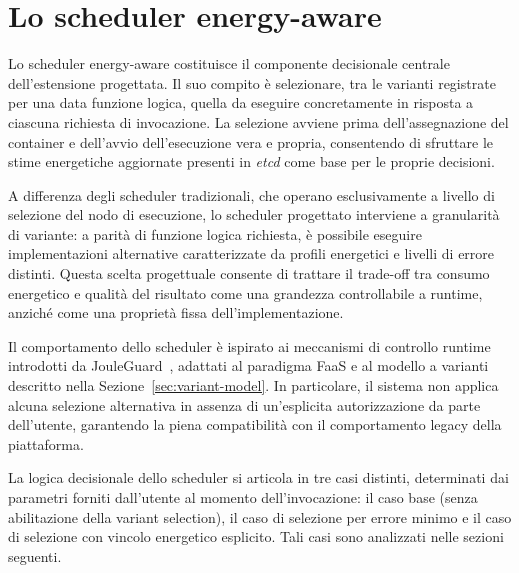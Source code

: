 
\section{Lo scheduler energy-aware}
\label{sec:scheduler}

Lo scheduler energy-aware costituisce il componente decisionale centrale
dell'estensione progettata. Il suo compito è selezionare, tra le varianti
registrate per una data funzione logica, quella da eseguire concretamente
in risposta a ciascuna richiesta di invocazione. La selezione avviene
prima dell'assegnazione del container e dell'avvio dell'esecuzione vera e
propria, consentendo di sfruttare le stime energetiche aggiornate presenti
in \textit{etcd} come base per le proprie decisioni.

A differenza degli scheduler tradizionali, che operano esclusivamente a
livello di selezione del nodo di esecuzione, lo scheduler progettato
interviene a granularità di variante: a parità di funzione logica
richiesta, è possibile eseguire implementazioni alternative caratterizzate
da profili energetici e livelli di errore distinti. Questa scelta
progettuale consente di trattare il trade-off tra consumo energetico e
qualità del risultato come una grandezza controllabile a runtime, anziché
come una proprietà fissa dell'implementazione.

Il comportamento dello scheduler è ispirato ai meccanismi di controllo
runtime introdotti da JouleGuard~\cite{jouleguard}, adattati al paradigma
FaaS e al modello a varianti descritto nella Sezione~\ref{sec:variant-model}.
In particolare, il sistema non applica alcuna selezione alternativa in
assenza di un'esplicita autorizzazione da parte dell'utente, garantendo la
piena compatibilità con il comportamento legacy della piattaforma.

La logica decisionale dello scheduler si articola in tre casi distinti,
determinati dai parametri forniti dall'utente al momento dell'invocazione:
il caso base (senza abilitazione della variant selection), il caso di
selezione per errore minimo e il caso di selezione con vincolo
energetico esplicito. Tali casi sono analizzati nelle sezioni seguenti.

%


